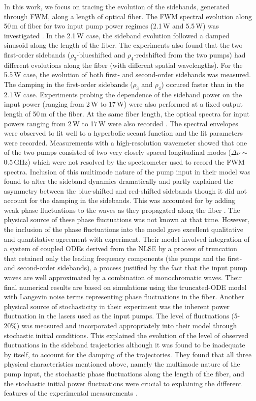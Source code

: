 In this work, we focus on tracing the evolution of the sidebands, generated
through FWM, along a length of optical fiber. The FWM spectral evolution along
50\,m of fiber for two input pump power regimes (2.1\,W and 5.5\,W) was
investigated \cite{hart1}. In the 2.1\,W case, the sideband evolution followed a damped
sinusoid along the length of the fiber. The experiments also found that the
two first-order sidebands ($\rho_3$-blueshifted and $\rho_4$-redshifted from
the two pumps) had different evolutions along the fiber (with different
spatial wavelengths). For the 5.5\,W case, the evolution of both first- and
second-order sidebands was measured. The damping in the first-order sidebands
($\rho_3$ and $\rho_4$) occured faster than in the 2.1\,W case. Experiments
probing the dependence of the sideband power on the input power (ranging from
2\,W to 17\,W) were also performed at a fixed output length of 50\,m of the fiber.
At the same fiber length, the optical spectra for input powers ranging from
2\,W to 17\,W were also recorded \cite{hart1}. The spectral envelopes were observed to fit
well to a hyperbolic secant function and the fit parameters were recorded.
Measurements with a high-resolution wavemeter showed that one of the two pumps
consisted of two very closely spaced longitudinal modes
($\Delta\nu\sim$ 0.5\,GHz) which were not resolved by the spectrometer used to
record the FWM spectra. Inclusion of this multimode nature of the pump input
in their model was found to alter the sideband dynamics dramatically and
partly explained the asymmetry between the blue-shifted and red-shifted
sidebands though it did not account for the damping in the sidebands. This
was accounted for by adding weak phase fluctuations to the waves as they
propagated along the fiber \cite{hart1}. The physical source of these phase fluctuations
was not known at that time. However, the inclusion of the phase fluctuations
into the model gave excellent qualitative and quantitative agreement with
experiment. Their model involved integration of a system of coupled ODEs
derived from the NLSE \cite{thompson1} by a process of truncation that
retained only the leading frequency components (the pumps and the first- and
second-order sidebands), a process justified by the fact that the input pump
waves are well approximated by a combination of monochromatic waves. Their
final numerical results are based on simulations using the truncated-ODE model
with Langevin noise terms representing phase fluctuations in the fiber.
Another physical source of stochasticity in their experiment was the inherent
power fluctuation in the lasers used as the input pumps. The level of
fluctuations (5-20\%) was measured and incorporated appropriately into their
model through stochastic initial conditions. This explained the evolution of
the level of observed fluctuations in the sideband trajectories although it
was found to be inadequate by itself, to account for the damping of the
trajectories. They found that all three physical characteristics mentioned
above, namely the multimode nature of the pump input, the stochastic phase
fluctuations along the length of the fiber, and the stochastic initial power
fluctuations were crucial to explaining the different features of the
experimental measurements \cite{hart1}.

